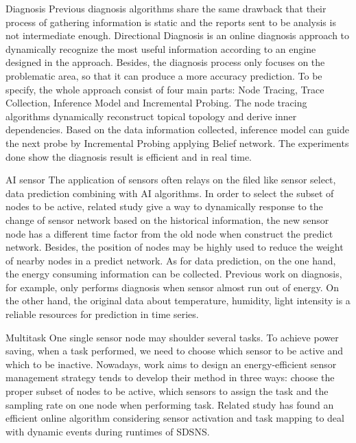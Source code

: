Diagnosis
	Previous diagnosis algorithms share the same drawback that their process of gathering information is static and the reports sent to be analysis is not intermediate enough. Directional Diagnosis is an online diagnosis approach to dynamically recognize the most useful information according to an engine designed in the approach. Besides, the diagnosis process only focuses on the problematic area, so that it can produce a more accuracy prediction. To be specify, the whole approach consist of four main parts: Node Tracing, Trace Collection, Inference Model and Incremental Probing. The node tracing algorithms dynamically reconstruct topical topology and derive inner dependencies. Based on the data information collected, inference model can guide the next probe by Incremental Probing applying Belief network. The experiments done show the diagnosis result is efficient and in real time.

AI sensor
	The application of sensors often relays on the filed like sensor select, data prediction combining with AI algorithms. In order to select the subset of nodes to be active, related study give a way to dynamically response to the change of sensor network based on the historical information, the new sensor node has a different time factor from the old node when construct the predict network. Besides, the position of nodes may be highly used to reduce the weight of nearby nodes in a predict network. As for data prediction, on the one hand, the energy consuming information can be collected. Previous work on diagnosis, for example, only performs diagnosis when sensor almost run out of energy. On the other hand, the original data about temperature, humidity, light intensity is a reliable resources for prediction in time series. 

Multitask
	One single sensor node may shoulder several tasks. To achieve power saving, when a task performed, we need to choose which sensor to be active and which to be inactive. Nowadays, work aims to design an energy-efficient sensor management strategy tends to develop their method in three ways: choose the proper subset of nodes to be active, which sensors to assign the task and the sampling rate on one node when performing task. Related study has found an efficient online algorithm considering sensor activation and task mapping to deal with dynamic events during runtimes of SDSNS.

